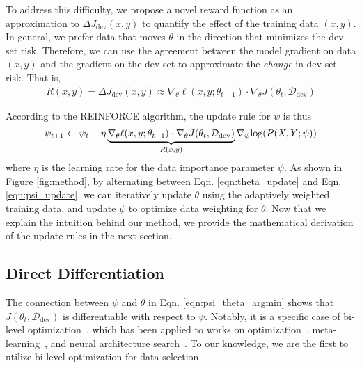 To address this difficulty, we propose a novel reward function as an approximation to $\Delta J_{\text{dev}}(x, y)$ to quantify the effect of the training data $(x, y)$. In general, we prefer data that moves $\theta$ in the direction that minimizes the dev set risk. Therefore, we can use the agreement between the model gradient on data $(x, y)$ and the gradient on the dev set to approximate the \textit{change} in dev set risk. That is, 
\begin{align}
    \label{eqn:reward_fn}
    R(x, y) = \Delta J_{\text{dev}}(x, y) \approx \nabla_\theta \ell(x, y; \theta_{t-1}) \cdot \nabla_\theta J(\theta_t, \mathcal{D}_\text{dev}) 
\end{align}

According to the REINFORCE algorithm, the update rule for $\psi$ is thus
\begin{align}
    \label{eqn:psi_update}
    \psi_{t+1} \leftarrow  \psi_t + \eta \underbrace{\nabla_\theta \ell(x, y; \theta_{t-1}) \cdot \nabla_\theta J(\theta_t, \mathcal{D}_\text{dev})}_{\mathclap{R(x, y)}} \nabla_\psi \text{log}(P(X, Y;\psi))
\end{align}
where $\eta$ is the learning rate for the data importance parameter $\psi$. As shown in Figure \ref{fig:method}, by alternating between Eqn. \ref{eqn:theta_update} and Eqn. \ref{eqn:psi_update}, we can iteratively update $\theta$ using the adaptively weighted training data, and update $\psi$ to optimize data weighting for $\theta$. Now that we explain the intuition behind our method, we provide the mathematical derivation of the update rules in the next section.  

\subsection{\label{sec:diff_data_selection}Direct Differentiation}

The connection between $\psi$ and $\theta$ in Eqn. \ref{eqn:psi_theta_argmin} shows that $J(\theta_t, \mathcal{D}_\text{dev})$ is differentiable with respect to $\psi$. Notably, it is a specific case of bi-level optimization~\citep{bilevel_optim}, which has been applied to works on optimization~\citep{hyper_grad}, meta-learning~\citep{finn2017model}, and neural architecture search~\citep{darts}. To our knowledge, we are the first to utilize bi-level optimization for data selection. 

